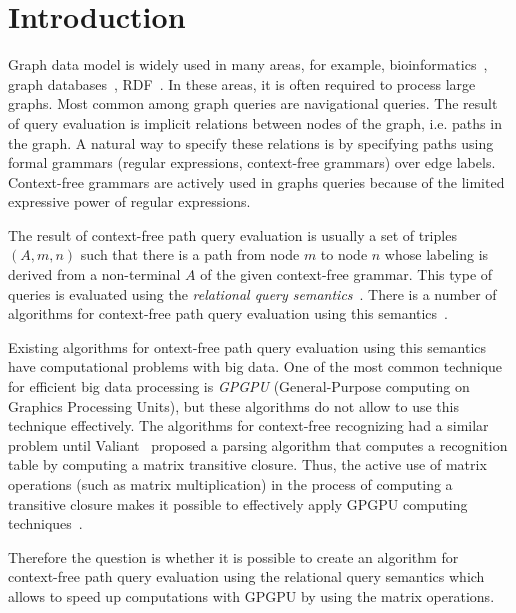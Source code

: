 \documentclass[sigconf,edbt]{acmart-edbt2018}
\begin{document}

\maketitle

\section{Introduction}
Graph data model is widely used in many areas, for example, bioinformatics~\cite{Bio}, graph databases~\cite{graphDB}, RDF~\cite{RDF}. In these areas, it is often required to process large graphs. Most common among graph queries are navigational queries. The result of query evaluation is implicit relations between nodes of the graph, i.e. paths in the graph. A natural way to specify these relations is by specifying paths using formal grammars (regular expressions, context-free grammars) over edge labels. Context-free grammars are actively used in graphs queries because of the limited expressive power of regular expressions. 

The result of context-free path query evaluation is usually a set of triples $(A, m, n)$ such that there is a path from node $m$ to node $n$ whose labeling is derived from a non-terminal $A$ of the given context-free grammar. This type of queries is evaluated using the \textit{relational query semantics}~\cite{hellingsRelational}. There is a number of algorithms for context-free path query evaluation using this semantics~\cite{GLL, hellingsRelational, RDF}.

Existing algorithms for ontext-free path query evaluation using this semantics have computational problems with big data. One of the most common technique for efficient big data processing is \textit{GPGPU} (General-Purpose computing on Graphics Processing Units), but these algorithms do not allow to use this technique effectively. The algorithms for context-free recognizing had a similar problem until Valiant~\cite{valiant} proposed a parsing algorithm that computes a recognition table by computing a matrix transitive closure. Thus, the active use of matrix operations (such as matrix multiplication) in the process of computing a transitive closure makes it possible to effectively apply GPGPU computing techniques~\cite{matricesOnGPGPU}.

Therefore the question is whether it is possible to create an algorithm for context-free path query evaluation using the relational query semantics which allows to speed up computations with GPGPU by using the matrix operations.
\end{document}
